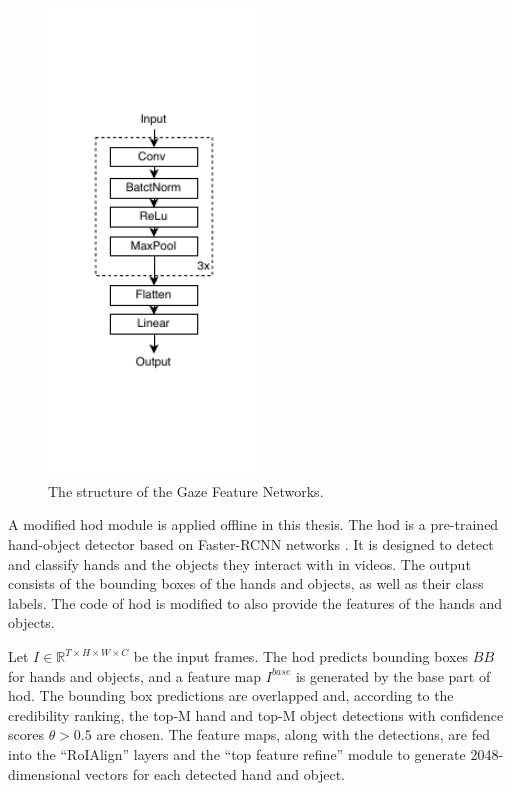 \begin{figure}
    \centering
    \includegraphics[width=0.5\textwidth]{graphics/gaze_feature_networks.pdf}
    \caption{The structure of the Gaze Feature Networks.}
    \label{fig:gaze_feature_networks}
\end{figure}

A modified \acrlong{hod} module \cite{shan_understanding_2020} is applied offline in this thesis. The \gls{hod} is a pre-trained hand-object detector based on Faster-RCNN networks \cite{ren_faster_2016}. It is designed to detect and classify hands and the objects they interact with in videos. The output consists of the bounding boxes of the hands and objects, as well as their class labels. The code of \gls{hod} is modified to also provide the features of the hands and objects.

Let $I \in \mathbb{R}^{T \times H \times W \times C}$ be the input frames. The \gls{hod} predicts bounding boxes $BB$ for hands and objects,  and a feature map $I^{base}$ is generated by the base part of \gls{hod}. The bounding box predictions are overlapped and, according to the credibility ranking, the top-M hand and top-M object detections with confidence scores $\theta > 0.5$ are chosen. The feature maps, along with the detections, are fed into the “RoIAlign” layers and the “top feature refine” module to generate 2048-dimensional vectors for each detected hand and object.

